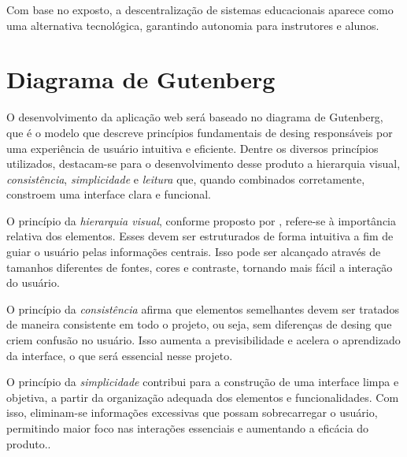 Com base no exposto, a descentralização de sistemas educacionais aparece como uma alternativa tecnológica, garantindo autonomia para instrutores e alunos.


\section{Diagrama de Gutenberg}

O desenvolvimento da aplicação web será baseado no diagrama de Gutenberg, que é o modelo que descreve princípios fundamentais de desing responsáveis por uma experiência de usuário intuitiva e eficiente. Dentre os diversos princípios utilizados, destacam-se para o desenvolvimento desse produto a {hierarquia visual}, \textit{consistência}, \textit{simplicidade} e \textit{leitura} que, quando combinados corretamente, constroem uma interface clara e funcional.

O princípio da \textit{hierarquia visual}, conforme proposto por \cite{lidwell2010}, refere-se à importância relativa dos elementos. Esses devem ser estruturados de forma intuitiva a fim de guiar o usuário pelas informações centrais. Isso pode ser alcançado através de tamanhos diferentes de fontes, cores  e contraste, tornando mais fácil a interação do usuário.

O princípio da \textit{consistência} afirma que elementos semelhantes devem ser tratados de maneira consistente em todo o projeto, ou seja, sem diferenças de desing que criem confusão no usuário. Isso aumenta a previsibilidade e acelera o aprendizado da interface, o que será essencial nesse projeto.

O princípio da \textit{simplicidade} contribui para a construção de uma interface limpa e objetiva, a partir da organização adequada dos elementos e funcionalidades. Com isso, eliminam-se informações excessivas que possam sobrecarregar o usuário, permitindo maior foco nas interações essenciais e aumentando a eficácia do produto..

